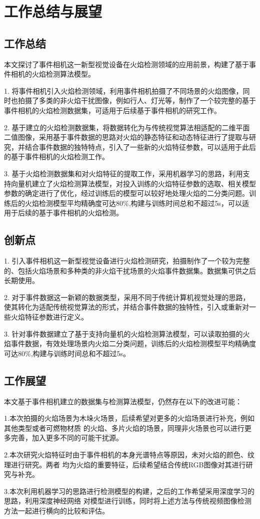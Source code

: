 
\chapter{工作总结与展望}

\section{工作总结}
本文探讨了事件相机这一新型视觉设备在火焰检测领域的应用前景，构建了基于事件相机的火焰检测算法模型。

1. 将事件相机引入火焰检测领域，利用事件相机拍摄了不同场景的火焰图像，同时也拍摄了多类的非火焰干扰图像，例如行人、灯光等，制作了一个较完整的基于事件相机的火焰检测数据集，可适用于后续基于事件相机的研究工作。
 
2. 基于建立的火焰检测数据集，将数据转化为与传统视觉算法相适配的二维平面二值图像，采用基于事件数据的思路对火焰的静态特征和动态特征进行了提取与研究，并结合事件数据的独特特点，引入了一些新的火焰特征参数，可以适用于此后的基于事件相机的火焰检测工作。

3. 基于火焰检测数据集和对火焰特征的提取工作，采用机器学习的思路，利用支持向量机建立了火焰检测算法模型，对投入训练的火焰特征参数的选取、相关模型参数的确定进行了优化，经过训练后的模型可以较好地处理火焰的二分类问题。训练后的火焰检测模型平均精确度可达80\%,构建与训练时间总和不超过5s，可以适用于后续的基于事件相机的火焰检测。

\section{创新点}
1. 引入事件相机这一新型视觉设备进行火焰检测研究，拍摄制作了一个较为完整的、包括火焰场景和多种类的非火焰干扰场景的火焰事件数据集。数据集可供之后长期使用。

2. 对于事件数据这一新颖的数据类型，采用不同于传统计算机视觉处理的思路，使其转化为适配传统视觉算法的形式，并结合事件数据的独特性，引入或重新对一些火焰特征参数进行定义。

3. 针对事件数据建立了基于支持向量机的火焰检测算法模型，可以读取拍摄的火焰事件数据，有效处理场景内火焰二分类问题，训练后的火焰检测模型平均精确度可达80\%,构建与训练时间总和不超过5s。
\section{工作展望}
本文基于事件相机建立的数据集与检测算法模型，仍然存在以下的改进可能：

1.本次拍摄的火焰场景为木垛火场景，后续希望对更多的火焰场景进行补充，例如其他类型或者可燃物材质
的火焰、多片火焰的场景，同理非火场景也可以进行更多完善，加入更多不同的可能干扰源。

2.本次研究火焰特征时由于事件相机的本身光谱特点等原因，未对火焰的颜色、纹理进行研究。两者
均为火焰的重要特征，后续希望结合传统RGB图像对其进行研究与补充。

3.本次利用机器学习的思路进行检测模型的构建，之后的工作希望采用深度学习的思路，利用深度神经网络
对模型进行训练，同时将上述方法与传统视频图像检测方法一起进行横向的比较和评估。